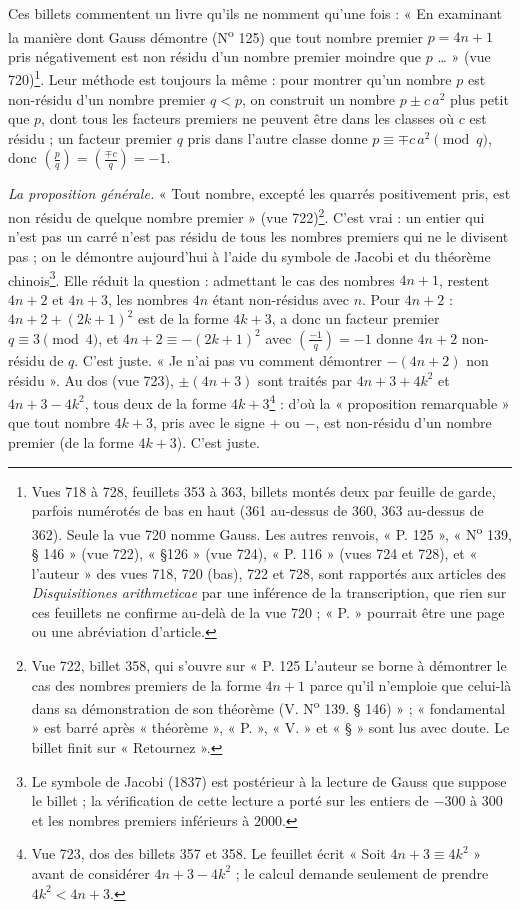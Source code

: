 \documentclass[11pt,a4paper]{article}
\begin{document}
Ces billets commentent un livre qu'ils ne nomment qu'une fois : « En examinant la manière dont Gauss démontre (N\textsuperscript{o} 125) que tout nombre premier $p=4n+1$ pris négativement est non résidu d'un nombre premier moindre que $p$ … » (vue 720)\footnote{Vues 718 à 728, feuillets 353 à 363, billets montés deux par feuille de garde, parfois numérotés de bas en haut (361 au-dessus de 360, 363 au-dessus de 362). Seule la vue 720 nomme Gauss. Les autres renvois, « P. 125 », « N\textsuperscript{o} 139, § 146 » (vue 722), « §126 » (vue 724), « P. 116 » (vues 724 et 728), et « l'auteur » des vues 718, 720 (bas), 722 et 728, sont rapportés aux articles des \emph{Disquisitiones arithmeticae} par une inférence de la transcription, que rien sur ces feuillets ne confirme au-delà de la vue 720 ; « P. » pourrait être une page ou une abréviation d'article.}. Leur méthode est toujours la même : pour montrer qu'un nombre $p$ est non-résidu d'un nombre premier $q<p$, on construit un nombre $p\pm c\,a^2$ plus petit que $p$, dont tous les facteurs premiers ne peuvent être dans les classes où $c$ est résidu ; un facteur premier $q$ pris dans l'autre classe donne $p\equiv\mp c\,a^2\pmod q$, donc $\left(\frac{p}{q}\right)=\left(\frac{\mp c}{q}\right)=-1$.

\emph{La proposition générale.} « Tout nombre, excepté les quarrés positivement pris, est non résidu de quelque nombre premier » (vue 722)\footnote{Vue 722, billet 358, qui s'ouvre sur « P. 125 L'auteur se borne à démontrer le cas des nombres premiers de la forme $4n+1$ parce qu'il n'emploie que celui-là dans sa démonstration de son théorème (V. N\textsuperscript{o} 139. § 146) » ; « fondamental » est barré après « théorème », « P. », « V. » et « § » sont lus avec doute. Le billet finit sur « Retournez ».}. C'est vrai : un entier qui n'est pas un carré n'est pas résidu de tous les nombres premiers qui ne le divisent pas ; on le démontre aujourd'hui à l'aide du symbole de Jacobi et du théorème chinois\footnote{Le symbole de Jacobi (1837) est postérieur à la lecture de Gauss que suppose le billet ; la vérification de cette lecture a porté sur les entiers de $-300$ à $300$ et les nombres premiers inférieurs à $2000$.}. Elle réduit la question : admettant le cas des nombres $4n+1$, restent $4n+2$ et $4n+3$, les nombres $4n$ étant non-résidus avec $n$. Pour $4n+2$ : $4n+2+(2k+1)^2$ est de la forme $4k+3$, a donc un facteur premier $q\equiv 3\pmod 4$, et $4n+2\equiv-(2k+1)^2$ avec $\left(\frac{-1}{q}\right)=-1$ donne $4n+2$ non-résidu de $q$. C'est juste. « Je n'ai pas vu comment démontrer $-(4n+2)$ non résidu ». Au dos (vue 723), $\pm(4n+3)$ sont traités par $4n+3+4k^2$ et $4n+3-4k^2$, tous deux de la forme $4k+3$\footnote{Vue 723, dos des billets 357 et 358. Le feuillet écrit « Soit $4n+3\equiv4k^2$ » avant de considérer $4n+3-4k^2$ ; le calcul demande seulement de prendre $4k^2<4n+3$.} : d'où la « proposition remarquable » que tout nombre $4k+3$, pris avec le signe $+$ ou $-$, est non-résidu d'un nombre premier (de la forme $4k+3$). C'est juste.
\end{document}
